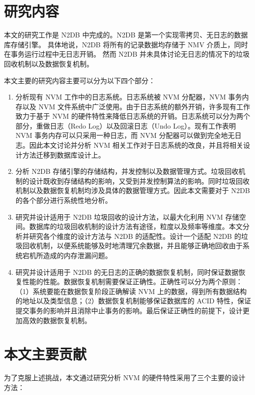 \section{研究内容}

本文的研究工作是 N2DB 中完成的。N2DB 是第一个实现零拷贝、无日志的数据库存储引擎。
具体地说，N2DB 将所有的记录数据均存储于 NMV 介质上，同时在事务运行过程中无日志开销。
然而 N2DB 并未具体讨论无日志的情况下的垃圾回收机制以及数据恢复机制。

本文主要的研究内容主要可以分为以下四个部分：
\begin{enumerate}
    \item 分析现有 NVM 工作中的日志系统。日志系统被 NVM 分配器，NVM 事务内存以及 NVM 文件系统中广泛使用。由于日志系统的额外开销，许多现有工作致力于基于 NVM 的硬件特性来降低日志系统的开销。日志系统可以分为两个部分，重做日志（Redo Log）以及回滚日志（Undo Log）。现有工作表明 NVM 事务内存可以只采用一种日志，而 NVM 分配器可以做到完全地无日志。因此本文讨论并分析 NVM 相关工作对于日志系统的改良，并且将相关设计方法迁移到数据库设计上。
    \item 分析 N2DB 存储引擎的存储结构，并发控制以及数据管理方式。垃圾回收机制的设计既收到存储结构的影响，又受到并发控制算法的影响。同时垃圾回收机制以及数据恢复机制均涉及具体的数据管理方式。因此本文需要对于 N2DB 的各个部分进行系统性地分析。
    \item 研究并设计适用于 N2DB 垃圾回收的设计方法，以最大化利用 NVM 存储空间。数据库的垃圾回收机制的设计方法有途径，粒度以及频率等维度。本文分析并研究各个维度的设计方法与 N2DB 的适配性。设计一个适配 N2DB 的垃圾回收机制，以便系统能够及时地清理冗余数据，并且能够正确地回收由于系统宕机所造成的内存泄漏问题。
    \item 研究并设计适用于 N2DB 的无日志的正确的数据恢复机制，同时保证数据恢复性能的性能。数据恢复机制需要保证正确性。正确性可以分为两个原则：（1）系统要能在数据恢复阶段正确解读 NVM 上的数据，得到所有数据结构的地址以及类型信息；（2）数据恢复机制能够保证数据库的 ACID 特性，保证提交事务的影响并且消除中止事务的影响。最后保证正确性的前提下，设计更加高效的数据恢复机制。
\end{enumerate}

\section{本文主要贡献}

为了克服上述挑战，本文通过研究分析 NVM 的硬件特性采用了三个主要的设计方法：

